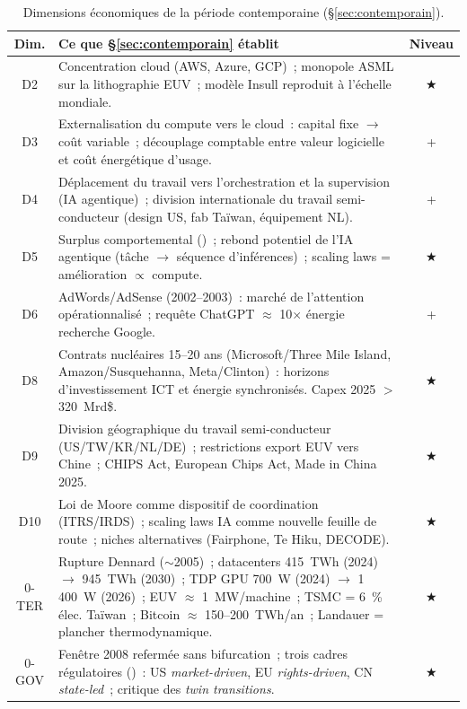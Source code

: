 \begin{table}[htbp]
\caption{Dimensions économiques de la période contemporaine (§\ref{sec:contemporain}).}\label{tab:contemporain-dimensions}
\centering\small
\renewcommand{\arraystretch}{1.15}
\begin{tabularx}{\textwidth}{@{}cXc@{}}
\toprule
\textbf{Dim.} & \textbf{Ce que §\ref{sec:contemporain} établit} & \textbf{Niveau} \\
\midrule
D2 & Concentration cloud (AWS, Azure, GCP)~; monopole ASML sur la lithographie EUV~; modèle Insull reproduit à l'échelle mondiale. & ★ \\
D3 & Externalisation du compute vers le cloud~: capital fixe $\rightarrow$ coût variable~; découplage comptable entre valeur logicielle et coût énergétique d'usage. & + \\
D4 & Déplacement du travail vers l'orchestration et la supervision (IA agentique)~; division internationale du travail semi-conducteur (design US, fab Taïwan, équipement NL). & + \\
D5 & Surplus comportemental (\textcite{zuboff_surveillance_2019})~; rebond potentiel de l'IA agentique (tâche $\rightarrow$ séquence d'inférences)~; scaling laws = amélioration $\propto$ compute. & ★ \\
D6 & AdWords/AdSense (2002--2003)~: marché de l'attention opérationnalisé~; requête ChatGPT $\approx$ 10$\times$ énergie recherche Google. & + \\
D8 & Contrats nucléaires 15--20 ans (Microsoft/Three Mile Island, Amazon/Susquehanna, Meta/Clinton)~: horizons d'investissement ICT et énergie synchronisés. Capex 2025 $>$ 320~Mrd\$. & ★ \\
D9 & Division géographique du travail semi-conducteur (US/TW/KR/NL/DE)~; restrictions export EUV vers Chine~; CHIPS Act, European Chips Act, Made in China 2025. & ★ \\
D10 & Loi de Moore comme dispositif de coordination (ITRS/IRDS)~; scaling laws IA comme nouvelle feuille de route~; niches alternatives (Fairphone, Te Hiku, DECODE). & ★ \\
\midrule
0-TER & Rupture Dennard ($\sim$2005)~; datacenters 415~TWh (2024) $\rightarrow$ 945~TWh (2030)~; TDP GPU 700~W (2024) $\rightarrow$ 1\,400~W (2026)~; EUV $\approx$ 1~MW/machine~; TSMC = 6~\% élec. Taïwan~; Bitcoin $\approx$ 150--200~TWh/an~; Landauer = plancher thermodynamique. & ★ \\
0-GOV & Fenêtre 2008 refermée sans bifurcation~; trois cadres régulatoires (\textcite{bradford_digital_2023})~: US \emph{market-driven}, EU \emph{rights-driven}, CN \emph{state-led}~; critique des \emph{twin transitions}. & ★ \\
\bottomrule
\end{tabularx}
\renewcommand{\arraystretch}{1.0}
\end{table}


